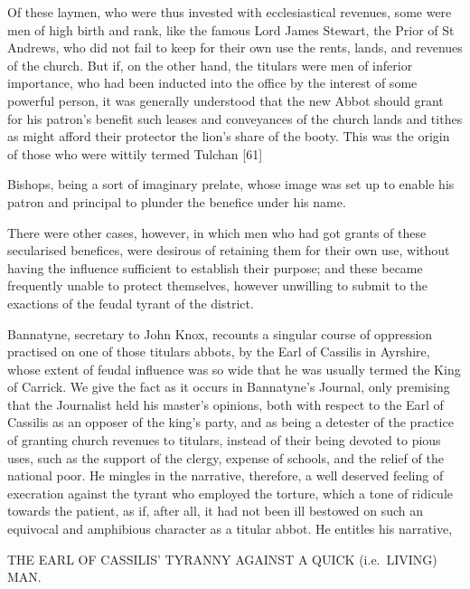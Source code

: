 Of these laymen, who were thus invested with ecclesiastical revenues,
some were men of high birth and rank, like the famous Lord James
Stewart, the Prior of St Andrews, who did not fail to keep for their own
use the rents, lands, and revenues of the church. But if, on the other
hand, the titulars were men of inferior importance, who had been
inducted into the office by the interest of some powerful person, it was
generally understood that the new Abbot should grant for his patron's
benefit such leases and conveyances of the church lands and tithes as
might afford their protector the lion's share of the booty. This was the
origin of those who were wittily termed Tulchan {[}61{]}

Bishops, being a sort of imaginary prelate, whose image was set up to
enable his patron and principal to plunder the benefice under his name.

There were other cases, however, in which men who had got grants of
these secularised benefices, were desirous of retaining them for their
own use, without having the influence sufficient to establish their
purpose; and these became frequently unable to protect themselves,
however unwilling to submit to the exactions of the feudal tyrant of the
district.

Bannatyne, secretary to John Knox, recounts a singular course of
oppression practised on one of those titulars abbots, by the Earl of
Cassilis in Ayrshire, whose extent of feudal influence was so wide that
he was usually termed the King of Carrick. We give the fact as it occurs
in Bannatyne's Journal, only premising that the Journalist held his
master's opinions, both with respect to the Earl of Cassilis as an
opposer of the king's party, and as being a detester of the practice of
granting church revenues to titulars, instead of their being devoted to
pious uses, such as the support of the clergy, expense of schools, and
the relief of the national poor. He mingles in the narrative, therefore,
a well deserved feeling of execration against the tyrant who employed
the torture, which a tone of ridicule towards the patient, as if, after
all, it had not been ill bestowed on such an equivocal and amphibious
character as a titular abbot. He entitles his narrative,

THE EARL OF CASSILIS' TYRANNY AGAINST A QUICK (i.e.~LIVING) MAN.

